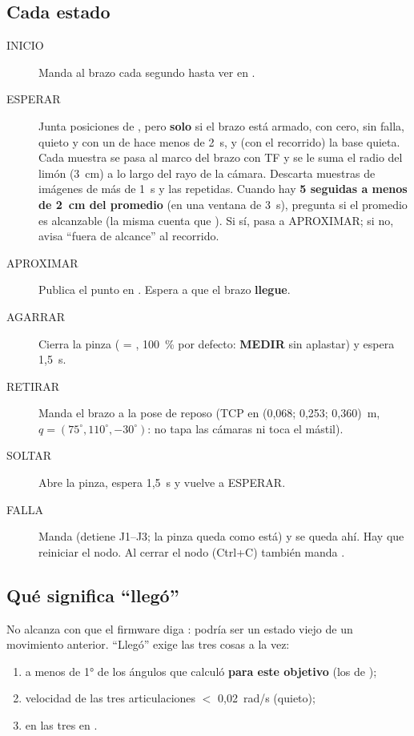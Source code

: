 \subsection{Cada estado}
\begin{description}
  \item[INICIO] Manda  al brazo cada segundo hasta ver  en .
  \item[ESPERAR] Junta posiciones de , pero \textbf{solo} si el brazo está armado, con cero,
        sin falla, quieto y con un  de hace menos de 2~s, y (con el recorrido) la base quieta. Cada
        muestra se pasa al marco del brazo con TF y se le suma el radio del limón (3~cm) a lo largo del rayo de la
        cámara. Descarta muestras de imágenes de más de 1~s y las repetidas. Cuando hay \textbf{5 seguidas a menos de
        2~cm del promedio} (en una ventana de 3~s), pregunta si el promedio es alcanzable (la misma cuenta que
        ). Si sí, pasa a APROXIMAR; si no, avisa ``fuera de alcance'' al recorrido.
  \item[APROXIMAR] Publica el punto en . Espera a que el brazo \textbf{llegue}.
  \item[AGARRAR] Cierra la pinza ( = , 100~\% por defecto: \textbf{MEDIR} sin
        aplastar) y espera 1,5~s.
  \item[RETIRAR] Manda el brazo a la pose de reposo (TCP en (0,068; 0,253; 0,360)~m, $q = (75^\circ, 110^\circ, -30^\circ)$: no tapa
        las cámaras ni toca el mástil).
  \item[SOLTAR] Abre la pinza, espera 1,5~s y vuelve a ESPERAR.
  \item[FALLA] Manda  (detiene J1--J3; la pinza queda como está) y se queda ahí. Hay que reiniciar el nodo. Al
        cerrar el nodo (Ctrl+C) también manda .
\end{description}

\subsection{Qué significa ``llegó''}
No alcanza con que el firmware diga : podría ser un estado viejo de un movimiento anterior. ``Llegó''
exige las tres cosas a la vez:
\begin{enumerate}
  \item {} a menos de 1° de los ángulos que calculó  \textbf{para este
        objetivo} (los de );
  \item velocidad de las tres articulaciones $<$ 0,02~rad/s (quieto);
  \item {} en las tres en .
\end{enumerate}

